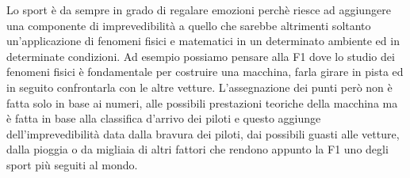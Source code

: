 Lo sport è da sempre in grado di regalare emozioni perchè riesce ad aggiungere una componente di imprevedibilità a quello che sarebbe altrimenti soltanto un'applicazione di fenomeni fisici e matematici in un determinato ambiente ed in determinate condizioni. Ad esempio possiamo pensare alla F1 dove lo studio dei fenomeni fisici è fondamentale per costruire una macchina, farla girare in pista ed in seguito confrontarla con le altre vetture. L'assegnazione dei punti però non è fatta solo in base ai numeri, alle possibili prestazioni teoriche della macchina ma è fatta in base alla classifica d'arrivo dei piloti e questo aggiunge dell'imprevedibilità data dalla bravura dei piloti, dai possibili guasti alle vetture, dalla pioggia o da migliaia di altri fattori che rendono appunto la F1 uno degli sport più seguiti al mondo.